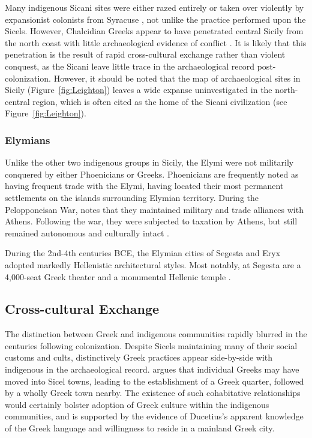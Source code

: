 \documentclass{../../../coursework}
\begin{document}
Many indigenous Sicani sites were either razed entirely or taken over
violently by expansionist colonists from Syracuse \parencite{Boa80}, not
unlike the practice performed upon the Sicels. However, Chalcidian Greeks
appear to have penetrated central Sicily from the north coast with little
archaeological evidence of conflict \parencite{Sjo73}. It is likely that this
penetration is the result of rapid cross-cultural exchange rather than violent
conquest, as the Sicani leave little trace in the archaeological record
post-colonization. However, it should be noted that the map of archaeological
sites in Sicily (Figure~\ref{fig:Leighton}) leaves a wide expanse
uninvestigated in the north-central region, which is often cited as the home
of the Sicani civilization (see Figure~\ref{fig:Leighton}).

\subsubsection{Elymians}

Unlike the other two indigenous groups in Sicily, the Elymi were not
militarily conquered by either Phoenicians or Greeks. Phoenicians are
frequently noted as having frequent trade with the Elymi, having located their
most permanent settlements on the islands surrounding Elymian territory.
During the Pelopponeisan War, \citeauthor{Thucydides} notes that they
maintained military and trade alliances with Athens. Following the war, they
were subjected to taxation by Athens, but still remained autonomous and
culturally intact \parencite[VI.6]{Thucydides}.

During the 2nd-4th centuries BCE, the Elymian cities of Segesta and Eryx
adopted markedly Hellenistic architectural styles. Most notably, at Segesta
are a 4,000-seat Greek theater \parencite{Dan04} and a monumental Hellenic
temple \parencite{Bia84}.

\subsection{Cross-cultural Exchange}

The distinction between Greek and indigenous communities rapidly blurred in
the centuries following colonization. Despite Sicels maintaining many of their
social customs and cults, distinctively Greek practices appear side-by-side
with indigenous in the archaeological record. \textcite{Boa80} argues that
individual Greeks may have moved into Sicel towns, leading to the
establishment of a Greek quarter, followed by a wholly Greek town nearby. The
existence of such cohabitative relationships would certainly bolster adoption
of Greek culture within the indigenous communities, and is supported by the
evidence of Ducetius's apparent knowledge of the Greek language and
willingness to reside in a mainland Greek city.
\end{document}
